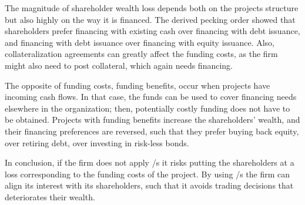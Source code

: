 \documentclass[main.tex]{subfiles}
\begin{document}
    The magnitude of shareholder wealth loss depends both on the projects structure
    but also highly on the way it is financed. 
    The derived pecking order showed that shareholders prefer 
    financing with existing cash over financing with debt issuance, 
    and financing with debt issuance over financing with equity issuance.
    Also, collateralization agreements can greatly affect the funding costs,
    as the firm might also need to post collateral, which again needs financing.

    The opposite of funding costs, funding benefits, occur when projects have incoming cash flows.
    In that case, the funds can be used to cover financing needs elsewhere in the organization;
    then, potentially costly funding does not have to be obtained.
    Projects with funding benefits increase the shareholders' wealth,
    and their financing preferences are reversed, 
    such that they prefer buying back equity, over retiring debt, over investing in risk-less bonds.

    In conclusion, if the firm does not apply \FVA/s it risks putting the shareholders at a loss
    corresponding to the funding costs of the project.
    By using \FVA/s the firm can align its interest with its shareholders,
    such that it avoids trading decisions that deteriorates their wealth. 
\end{document}
